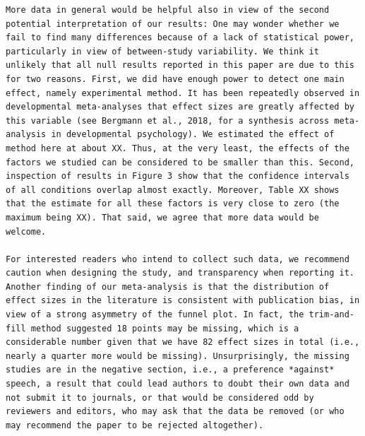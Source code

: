 \documentclass[man]{apa6}
\begin{document}
\begin{verbatim}
More data in general would be helpful also in view of the second potential interpretation of our results: One may wonder whether we fail to find many differences because of a lack of statistical power, particularly in view of between-study variability. We think it unlikely that all null results reported in this paper are due to this for two reasons. First, we did have enough power to detect one main effect, namely experimental method. It has been repeatedly observed in developmental meta-analyses that effect sizes are greatly affected by this variable (see Bergmann et al., 2018, for a synthesis across meta-analysis in developmental psychology). We estimated the effect of method here at about XX. Thus, at the very least, the effects of the factors we studied can be considered to be smaller than this. Second, inspection of results in Figure 3 show that the confidence intervals of all conditions overlap almost exactly. Moreover, Table XX shows that the estimate for all these factors is very close to zero (the maximum being XX). That said, we agree that more data would be welcome.

For interested readers who intend to collect such data, we recommend caution when designing the study, and transparency when reporting it. Another finding of our meta-analysis is that the distribution of effect sizes in the literature is consistent with publication bias, in view of a strong asymmetry of the funnel plot. In fact, the trim-and-fill method suggested 18 points may be missing, which is a considerable number given that we have 82 effect sizes in total (i.e., nearly a quarter more would be missing). Unsurprisingly, the missing studies are in the negative section, i.e., a preference *against* speech, a result that could lead authors to doubt their own data and not submit it to journals, or that would be considered odd by reviewers and editors, who may ask that the data be removed (or who may recommend the paper to be rejected altogether). 


\end{verbatim}
\end{document}
